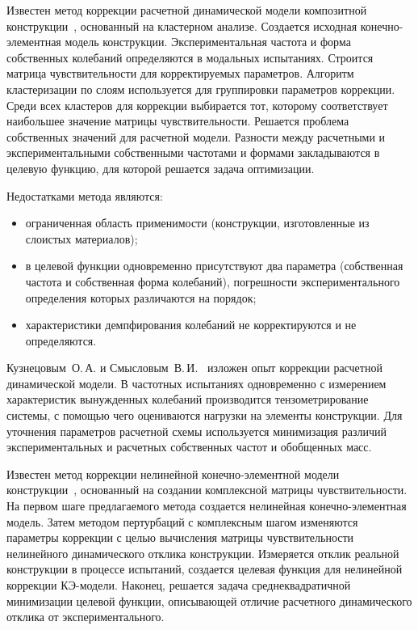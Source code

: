 Известен метод коррекции расчетной динамической модели композитной конструкции~\cite{lib:modelUpdating:CN107357992A}, основанный на кластерном анализе. Создается исходная конечно-элементная модель конструкции. Экспериментальная частота и форма собственных колебаний определяются в модальных испытаниях. Строится матрица чувствительности для корректируемых параметров. Алгоритм кластеризации по слоям используется для группировки параметров коррекции. Среди всех кластеров для коррекции выбирается тот, которому соответствует наибольшее значение матрицы чувствительности. Решается проблема собственных значений для расчетной модели. Разности между расчетными и экспериментальными собственными частотами и формами закладываются в целевую функцию, для которой решается задача оптимизации.

Недостатками метода являются: 
\begin{itemize}
	\item ограниченная область применимости (конструкции, изготовленные из слоистых материалов); 
	\item в целевой функции одновременно присутствуют два параметра (собственная частота и собственная форма колебаний), погрешности экспериментального определения которых различаются на порядок; 
	\item характеристики демпфирования колебаний не корректируются и не определяются. 
\end{itemize}

Кузнецовым~О.\,А. и Смысловым~В.\,И.~\cite{lib:modelUpdating:Kuznetsov} изложен опыт коррекции расчетной динамической модели. В частотных испытаниях одновременно с измерением характеристик вынужденных колебаний производится тензометрирование системы, с помощью чего оцениваются нагрузки на элементы конструкции. Для уточнения параметров расчетной схемы используется минимизация различий экспериментальных и расчетных собственных частот и обобщенных масс.

Известен метод коррекции нелинейной конечно-элементной модели конструкции~\cite{lib:modelUpdating:CN109885896A}, основанный на создании комплексной матрицы чувствительности. На первом шаге предлагаемого метода создается нелинейная конечно-элементная модель. Затем методом пертурбаций с комплексным шагом изменяются параметры коррекции с целью вычисления матрицы чувствительности нелинейного динамического отклика конструкции. Измеряется отклик реальной конструкции в процессе испытаний, создается целевая функция для нелинейной коррекции КЭ-модели. Наконец, решается задача среднеквадратичной минимизации целевой функции, описывающей отличие расчетного динамического отклика от экспериментального. 

